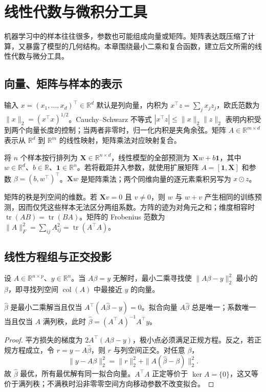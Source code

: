 \setcounter{chapter}{1} %
\chapter{线性代数与微积分工具}
\label{chap:ml-linear-algebra}

机器学习中的样本往往很多，参数也可能组成向量或矩阵。矩阵表达既压缩了计算，又暴露了模型的几何结构。本章围绕最小二乘和复合函数，建立后文所需的线性代数与微分工具。

\section{向量、矩阵与样本的表示}

输入 $x=(x_1,\ldots,x_d)^\top\in\mathbb R^d$ 默认是列向量，内积为 $x^\top z=\sum_jx_jz_j$，欧氏范数为 $\|x\|_2=(x^\top x)^{1/2}$。Cauchy--Schwarz 不等式 $|x^\top z|\leq\|x\|_2\|z\|_2$ 表明内积受到两个向量长度的控制；当两者非零时，归一化内积是夹角余弦。矩阵 $A\in\mathbb R^{m\times d}$ 表示从 $\mathbb R^d$ 到 $\mathbb R^m$ 的线性映射，矩阵乘法对应映射复合。

将 $n$ 个样本按行排列为 $\mathbf X\in\mathbb R^{n\times d}$，线性模型的全部预测为 $\mathbf Xw+b\mathbf1$，其中 $w\in\mathbb R^d$、$b\in\mathbb R$、$\mathbf1\in\mathbb R^n$。若将截距并入参数，就使用扩展矩阵 $A=[\mathbf1,\mathbf X]$ 和参数 $\beta=(b,w^\top)^\top$。$\mathbf Xw$ 是矩阵乘法；两个同维向量的逐元素乘积另写为 $x\odot z$。

矩阵的秩是列空间的维数。若 $\mathbf Xv=0$ 且 $v\ne0$，则 $w$ 与 $w+v$ 产生相同的训练预测，因而仅凭这些样本无法区分两组系数。方阵的迹为对角元之和；维度相容时 $\operatorname{tr}(AB)=\operatorname{tr}(BA)$。矩阵的 Frobenius 范数为 $\|A\|_F^2=\sum_{ij}A_{ij}^2=\operatorname{tr}(A^\top A)$。

\section{线性方程组与正交投影}

设 $A\in\mathbb R^{n\times p}$、$y\in\mathbb R^n$。当 $A\beta=y$ 无解时，最小二乘寻找使 $\|A\beta-y\|_2^2$ 最小的 $\beta$，即寻找列空间 $\operatorname{col}(A)$ 中最接近 $y$ 的向量。
\begin{proposition}[最小二乘与正规方程]
$\widehat\beta$ 是最小二乘解当且仅当 $A^\top(A\widehat\beta-y)=0$。拟合向量 $A\widehat\beta$ 总是唯一；系数唯一当且仅当 $A$ 满列秩，此时 $\widehat\beta=(A^\top A)^{-1}A^\top y$。
\end{proposition}
\begin{proof}
平方损失的梯度为 $2A^\top(A\beta-y)$，极小点必须满足正规方程。反之，若正规方程成立，令 $r=y-A\widehat\beta$，则 $r$ 与列空间正交。对任意 $\beta$，
\[
 \|y-A\beta\|_2^2=\|r\|_2^2+\|A(\widehat\beta-\beta)\|_2^2.
\]
故 $\widehat\beta$ 最优，所有最优解有同一拟合向量。$A^\top A$ 正定等价于 $\ker A=\{0\}$，这又等价于满列秩；不满秩时沿非零零空间方向移动参数不改变拟合。
\end{proof}

